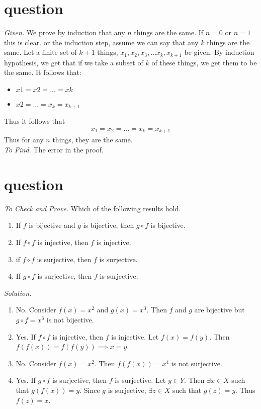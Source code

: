 \documentclass[11pt]{article}
\begin{document}
\section{question}
\emph{Given. } We prove by induction that any $n$ things are the same. If $n = 0$ or $n = 1$ this is clear. or the induction step, assume we can say that any $k$ things are the same. Let a finite set of $k+1$ things, $x_1, x_2, x_3,\ldots x_k,x_{k+1}$ be given. By induction hypothesis, we get that if we take a subset of $k$ of these things, we get them to be the same. It follows that:
\begin{itemize}
	\item $x1 = x2 = ... = xk$
	\item $x2 = ... = x_k = x_{k+1}$
\end{itemize}
Thus it follows that \begin{align*}
	x_1 = x_2 = ... = x_k = x_{k+1}
\end{align*}
Thus for any $n$ things, they are the same.\medskip \\
\emph{To Find. } The error in the proof.

\section{question}
\emph{To Check and Prove. } Which of the following results hold.
\begin{enumerate}
	\item If $f$ is bijective and $g$ is bijective, then $g \circ f$ is bijective.
	\item If $f \circ f$ is injective, then $f$ is injective.
	\item if $f \circ f$ is surjective, then $f$ is surjective.
	\item If $g \circ f$ is surjective, then $f$ is surjective.
\end{enumerate}
\emph{Solution. } \\
\begin{enumerate}
	\item No. Consider $f(x) = x^2$ and $g(x) = x^3$. Then $f$ and $g$ are bijective but $g \circ f = x^6$ is not bijective.
	\item Yes. If $f \circ f$ is injective, then $f$ is injective. Let $f(x) = f(y)$. Then $f(f(x)) = f(f(y)) \implies x = y$.
	\item No. Consider $f(x) = x^2$. Then $f(f(x)) = x^4$ is not surjective.
	\item Yes. If $g \circ f$ is surjective, then $f$ is surjective. Let $y \in Y$. Then $\exists x \in X$ such that $g(f(x)) = y$. Since $g$ is surjective, $\exists z \in X$ such that $g(z) = y$. Thus $f(z) = x$.
\end{enumerate}
\end{document}
